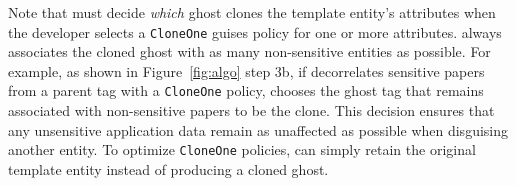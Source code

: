 Note that \sys must decide \emph{which} ghost clones the template entity's attributes when the
developer selects a \texttt{CloneOne} guises policy for one or more attributes. \sys always
associates the cloned ghost with as many non-sensitive entities as possible. For example, as shown
in Figure~\ref{fig:algo} step 3b, if \sys decorrelates sensitive papers from a parent tag with a
\texttt{CloneOne} policy, \sys chooses the ghost tag that remains associated with non-sensitive
papers to be the clone. This decision ensures that any unsensitive application
data remain as unaffected as possible when disguising another entity.
To optimize
\texttt{CloneOne} policies, \sys can simply retain the original template entity instead of producing
a cloned ghost.


\fi

